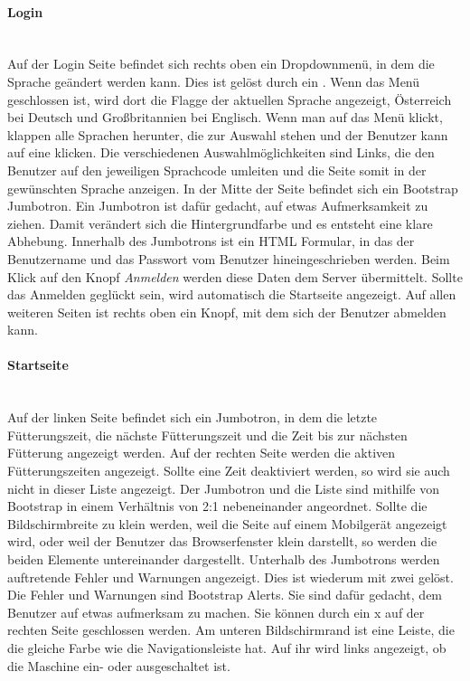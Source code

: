 \paragraph*{Login}\mbox{}\\
Auf der Login Seite befindet sich rechts oben ein Dropdownmenü, in dem die Sprache geändert werden kann. Dies ist gelöst durch ein . Wenn das Menü geschlossen ist, wird dort die Flagge der aktuellen Sprache angezeigt, Österreich bei Deutsch und Großbritannien bei Englisch. Wenn man auf das Menü klickt, klappen alle Sprachen herunter, die zur Auswahl stehen und der Benutzer kann auf eine klicken. Die verschiedenen Auswahlmöglichkeiten sind Links, die den Benutzer auf den jeweiligen Sprachcode umleiten und die Seite somit in der gewünschten Sprache anzeigen. In der Mitte der Seite befindet sich ein Bootstrap Jumbotron. Ein Jumbotron ist dafür gedacht, auf etwas Aufmerksamkeit zu ziehen. Damit verändert sich die Hintergrundfarbe und es entsteht eine klare Abhebung. Innerhalb des Jumbotrons ist ein \ac{HTML} Formular, in das der Benutzername und das Passwort vom Benutzer hineingeschrieben werden. Beim Klick auf den Knopf \textit{Anmelden} werden diese Daten dem Server übermittelt. Sollte das Anmelden geglückt sein, wird automatisch die Startseite angezeigt. Auf allen weiteren Seiten ist rechts oben ein Knopf, mit dem sich der Benutzer abmelden kann.

\paragraph*{Startseite}\mbox{}\\
Auf der linken Seite befindet sich ein Jumbotron, in dem die letzte Fütterungszeit, die nächste Fütterungszeit und die Zeit bis zur nächsten Fütterung angezeigt werden. Auf der rechten Seite werden die aktiven Fütterungszeiten angezeigt. Sollte eine Zeit deaktiviert werden, so wird sie auch nicht in dieser Liste angezeigt. Der Jumbotron und die Liste sind mithilfe von Bootstrap in einem Verhältnis von 2:1 nebeneinander angeordnet. Sollte die Bildschirmbreite zu klein werden, weil die Seite auf einem Mobilgerät angezeigt wird, oder weil der Benutzer das Browserfenster klein darstellt, so werden die beiden Elemente untereinander dargestellt. Unterhalb des Jumbotrons werden auftretende Fehler und Warnungen angezeigt. Dies ist wiederum mit zwei  gelöst. Die Fehler und Warnungen sind Bootstrap Alerts. Sie sind dafür gedacht, dem Benutzer auf etwas aufmerksam zu machen. Sie können durch ein x auf der rechten Seite geschlossen werden. Am unteren Bildschirmrand ist eine Leiste, die die gleiche Farbe wie die Navigationsleiste hat. Auf ihr wird links angezeigt, ob die Maschine ein- oder ausgeschaltet ist.

